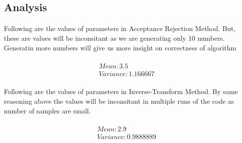 \documentclass{article}
\begin{document}
		\subsection{Analysis}
		\paragraph{}
			Following are the values of parameters in Acceptance Rejection Method. But, these are values will be inconsitant as we are generating only 10 numbers. Generatin more numbers will give us more insight on correctness of algorithm
		
	    \paragraph{}
		\begin{gather}
	    Mean:  3.5\\ 
        Variance:  1.166667 
	    \end{gather}
	    
	    \paragraph{}
	    Following are the values of parameters in Inverse-Transform Method. By same reasoning above the values will be inconsitant in multiple runs of the code as number of samples are small.
			
		\paragraph{}
		\begin{gather}
	    Mean:  2.9 \\
        Variance:  0.9888889 
	    \end{gather}
		
\end{document}
